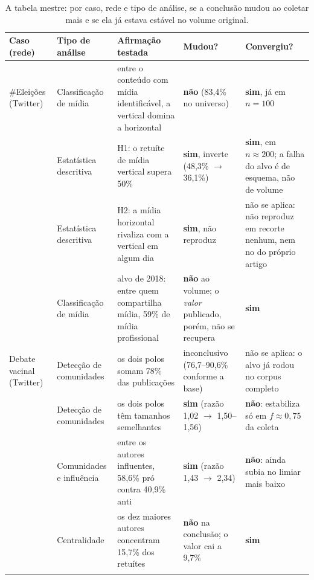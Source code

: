 \begin{table}[p]
\centering\scriptsize
\caption[A tabela mestre: mudou? e convergiu?]{A tabela mestre: por caso, rede e tipo de análise, se a conclusão mudou ao
coletar mais e se ela já estava estável no volume original.}
\label{tab:mestre}
\begin{tabularx}{\textwidth}{@{}>{\raggedright\arraybackslash}p{1.75cm}>{\raggedright\arraybackslash}p{2.15cm}X>{\raggedright\arraybackslash}p{2.7cm}>{\raggedright\arraybackslash}p{2.7cm}@{}}
\toprule
Caso (rede) & Tipo de análise & Afirmação testada & Mudou? & Convergiu? \\
\midrule
\#Eleições\-2014 (Twitter)
 & Classificação de mídia
 & entre o conteúdo com mídia identificável, a vertical domina a horizontal
 & \textbf{não} (83,4\% no universo)
 & \textbf{sim}, já em $n=100$ \\
\addlinespace[2pt]
 & Estatística descritiva
 & H1: o retuíte de mídia vertical supera 50\%
 & \textbf{sim}, inverte (48,3\% $\to$ 36,1\%)
 & \textbf{sim}, em $n\approx200$; a falha do alvo é de esquema, não de volume \\
\addlinespace[2pt]
 & Estatística descritiva
 & H2: a mídia horizontal rivaliza com a vertical em algum dia
 & \textbf{sim}, não reproduz
 & não se aplica: não reproduz em recorte nenhum, nem no do próprio artigo \\
\addlinespace[2pt]
 & Classificação de mídia
 & alvo de 2018: entre quem compartilha mídia, 59\% de mídia profissional
 & \textbf{não} ao volume; o \emph{valor} publicado, porém, não se recupera
 & \textbf{sim} \\
\midrule
Debate vacinal (Twitter)
 & Detecção de comunidades
 & os dois polos somam 78\% das publicações
 & inconclusivo (76,7--90,6\% conforme a base)
 & não se aplica: o alvo já rodou no corpus completo \\
\addlinespace[2pt]
 & Detecção de comunidades
 & os dois polos têm tamanhos semelhantes
 & \textbf{sim} (razão 1,02 $\to$ 1,50--1,56)
 & \textbf{não}: estabiliza só em $f\approx0{,}75$ da coleta \\
\addlinespace[2pt]
 & Comunidades e influência
 & entre os autores influentes, 58,6\% pró contra 40,9\% anti
 & \textbf{sim} (razão 1,43 $\to$ 2,34)
 & \textbf{não}: ainda subia no limiar mais baixo \\
\addlinespace[2pt]
 & Centralidade
 & os dez maiores autores concentram 15,7\% dos retuítes
 & \textbf{não} na conclusão; o valor cai a 9,7\%
 & \textbf{sim} \\
\addlinespace[2pt]

\end{tabularx}
\end{table}
